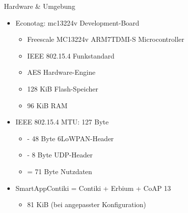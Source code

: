 \documentclass{beamer}
\begin{document}
\begin{frame}{Hardware \& Umgebung}
  \begin{itemize}
    \item Econotag: mc13224v Development-Board
    \begin{itemize}
      \item Freescale MC13224v ARM7TDMI-S Microcontroller
      \item IEEE 802.15.4 Funkstandard
      \item AES Hardware-Engine
      \item 128 KiB Flash-Speicher
      \item 96 KiB RAM
    \end{itemize}
    \item IEEE 802.15.4 MTU: 127 Byte
    \begin{itemize}
      \item - 48 Byte 6LoWPAN-Header
      \item - 8 Byte UDP-Header
      \item = 71 Byte Nutzdaten
    \end{itemize}
    \item SmartAppContiki = Contiki + Erbium + CoAP 13
    \begin{itemize}
      \item 81 KiB (bei angepasster Konfiguration)
    \end{itemize}
  \end{itemize}
\end{frame}
\end{document}

